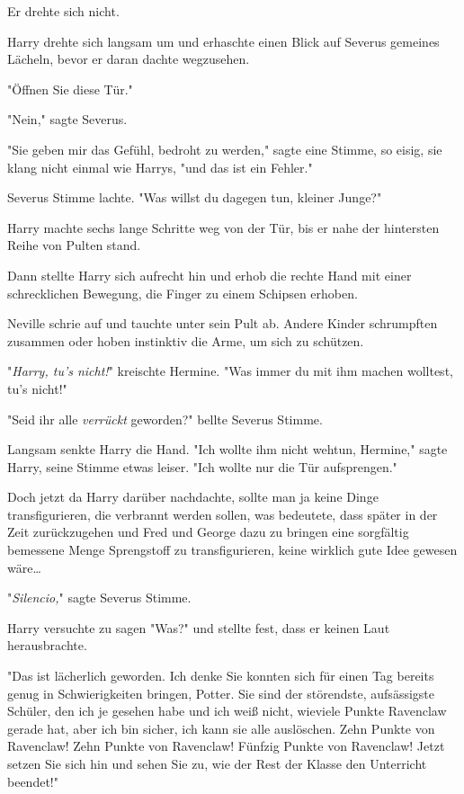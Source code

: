 {Er drehte sich nicht.

Harry drehte sich langsam um und erhaschte einen Blick auf Severus gemeines Lächeln, bevor er daran dachte wegzusehen.

"Öffnen Sie diese Tür."

"Nein," sagte Severus.

"Sie geben mir das Gefühl, bedroht zu werden," sagte eine Stimme, so eisig, sie klang nicht einmal wie Harrys, "und das ist ein Fehler."

Severus Stimme lachte. "Was willst du dagegen tun, kleiner Junge?"

Harry machte sechs lange Schritte weg von der Tür, bis er nahe der hintersten Reihe von Pulten stand.

Dann stellte Harry sich aufrecht hin und erhob die rechte Hand mit einer schrecklichen Bewegung, die Finger zu einem Schipsen erhoben.

Neville schrie auf und tauchte unter sein Pult ab. Andere Kinder schrumpften zusammen oder hoben instinktiv die Arme, um sich zu schützen.

"\emph{Harry, tu's nicht!}" kreischte Hermine. "Was immer du mit ihm machen wolltest, tu's nicht!"

"Seid ihr alle \emph{verrückt} geworden?" bellte Severus Stimme.

Langsam senkte Harry die Hand. "Ich wollte ihm nicht wehtun, Hermine," sagte Harry, seine Stimme etwas leiser. "Ich wollte nur die Tür aufsprengen."

Doch jetzt da Harry darüber nachdachte, sollte man ja keine Dinge transfigurieren, die verbrannt werden sollen, was bedeutete, dass später in der Zeit zurückzugehen und Fred und George dazu zu bringen eine sorgfältig bemessene Menge Sprengstoff zu transfigurieren, keine wirklich gute Idee gewesen wäre…

"\emph{Silencio,}" sagte Severus Stimme.

Harry versuchte zu sagen "Was?" und stellte fest, dass er keinen Laut herausbrachte.

"Das ist lächerlich geworden. Ich denke Sie konnten sich für einen Tag bereits genug in Schwierigkeiten bringen, Potter. Sie sind der störendste, aufsässigste Schüler, den ich je gesehen habe und ich weiß nicht, wieviele Punkte Ravenclaw gerade hat, aber ich bin sicher, ich kann sie alle auslöschen. Zehn Punkte von Ravenclaw! Zehn Punkte von Ravenclaw! Fünfzig Punkte von Ravenclaw! Jetzt setzen Sie sich hin und sehen Sie zu, wie der Rest der Klasse den Unterricht beendet!"

}
